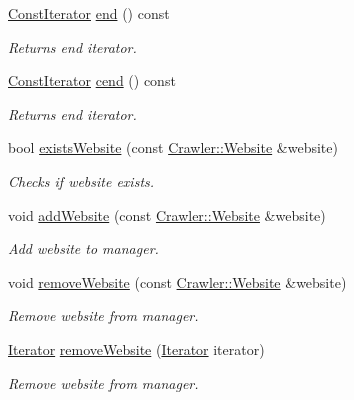 \begin{DoxyCompactItemize}
\hyperlink{class_crawler_1_1_website_manager_a5540e8864e8c8defbf06ebfc3aa6c7c8}{Const\+Iterator} \hyperlink{class_crawler_1_1_website_manager_adf7b27efbd44be2a7f8be01a4e57a2f8}{end} () const 
\begin{DoxyCompactList}\small\item\em Returns end iterator. \end{DoxyCompactList}\item 
\hyperlink{class_crawler_1_1_website_manager_a5540e8864e8c8defbf06ebfc3aa6c7c8}{Const\+Iterator} \hyperlink{class_crawler_1_1_website_manager_a18aad5f4a56da5d2f31e17b9c75e6dc4}{cend} () const 
\begin{DoxyCompactList}\small\item\em Returns end iterator. \end{DoxyCompactList}\item 
bool \hyperlink{class_crawler_1_1_website_manager_a226f24b306bb60ba3ffda550296b97a4}{exists\+Website} (const \hyperlink{class_crawler_1_1_website}{Crawler\+::\+Website} \&website)
\begin{DoxyCompactList}\small\item\em Checks if website exists. \end{DoxyCompactList}\item 
void \hyperlink{class_crawler_1_1_website_manager_ac0caf44a0602ab60f947f2a282069135}{add\+Website} (const \hyperlink{class_crawler_1_1_website}{Crawler\+::\+Website} \&website)
\begin{DoxyCompactList}\small\item\em Add website to manager. \end{DoxyCompactList}\item 
void \hyperlink{class_crawler_1_1_website_manager_ab148782b9fc087c25ddfa1ae2b53c9c7}{remove\+Website} (const \hyperlink{class_crawler_1_1_website}{Crawler\+::\+Website} \&website)
\begin{DoxyCompactList}\small\item\em Remove website from manager. \end{DoxyCompactList}\item 
\hyperlink{class_crawler_1_1_website_manager_a73a0d579dfd90c0f5eab55c0f0ae82a8}{Iterator} \hyperlink{class_crawler_1_1_website_manager_af33f67f613ab2110790e30670390dfcb}{remove\+Website} (\hyperlink{class_crawler_1_1_website_manager_a73a0d579dfd90c0f5eab55c0f0ae82a8}{Iterator} iterator)
\begin{DoxyCompactList}\small\item\em Remove website from manager. \end{DoxyCompactList}\item 

\end{DoxyCompactItemize}
